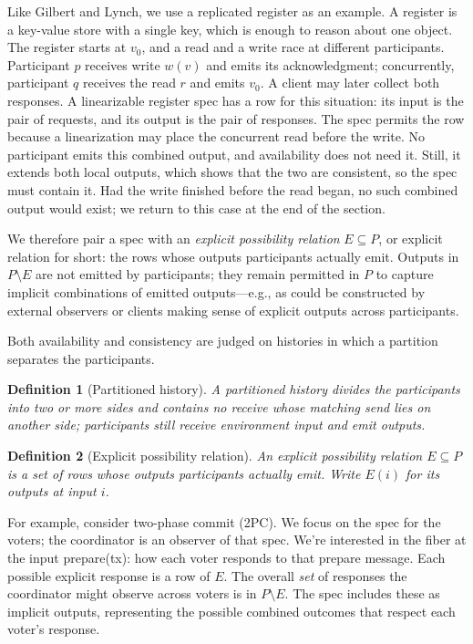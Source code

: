 \documentclass[sigconf]{cidr-2027}
\newtheorem{definition}{Definition}
\theoremstyle{remark}
\newcommand{\outrel}{extends\xspace}          %
\begin{document}
Like Gilbert and Lynch, we use a replicated register as an example.
A register is a key-value store with a single key, which is enough to reason
about one object.  The register starts at $v_0$, and a read and a write race at
different participants.  Participant $p$ receives write $w(v)$ and emits its
acknowledgment; concurrently, participant $q$ receives the read $r$ and emits
$v_0$.  A client may later collect both responses.  A linearizable register
spec has a row for this situation: its input is the pair of requests, and its
output is the pair of responses.  The spec permits the row because a
linearization may place the concurrent read before the write.  No participant
emits this combined output, and availability does not need it.  Still, it
\outrel both local outputs, which shows that the two are consistent, so the
spec must contain it.  Had the write finished before the read began, no such
combined output would exist; we return to this case at the end of the section.

We therefore pair a spec with an \emph{explicit possibility relation}
$E\subseteq P$, or explicit relation for short: the rows whose outputs
participants actually emit.  Outputs in
$P\setminus E$ are not emitted by participants;
they remain permitted in $P$ to capture implicit combinations of emitted outputs---e.g.,
as could be constructed by external observers or clients making sense of explicit outputs
across participants.

Both availability and consistency are judged on histories in which a partition
separates the participants.

\begin{definition}[Partitioned history]
\label{def:partitioned-history}
A \emph{partitioned history} divides the participants into two or more
sides and contains no receive whose matching send lies on another
side; participants still receive environment input and emit outputs.
\end{definition}

\begin{definition}[Explicit possibility relation]
\label{def:explicit-relation}
An \emph{explicit possibility relation} $E\subseteq P$ is a set of rows whose
outputs participants actually emit.  Write $E(i)$ for its outputs at input
$i$.
\end{definition}

For example, consider two-phase commit (2PC).  We focus on the spec for the
voters; the coordinator is an observer of that spec.  We're interested in the
fiber at the input \textsf{prepare(tx)}: how each voter responds to that
prepare message.  Each possible explicit response is a row of $E$.  The overall
\emph{set} of responses the coordinator might observe across voters is in
$P\setminus E$.  The spec includes these as implicit outputs, representing the
possible combined outcomes that respect each voter's response.
\end{document}
